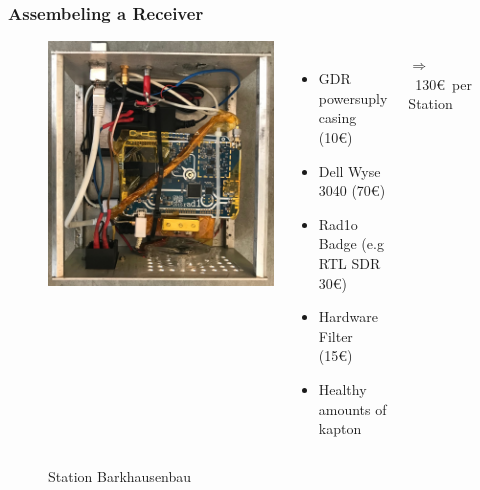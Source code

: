 \begin{frame}
\frametitle{Assembeling a Receiver}

\begin{figure}
\begin{columns}
\begin{center}
\includegraphics[height=0.7\textheight]{figs/station_barkhausen.jpg}
\end{center}
\raggedright
\caption{Station Barkhausenbau}
\vspace{0.5cm}

\begin{itemize}
  \item GDR powersuply casing (10\euro)
  \item Dell Wyse 3040 (70\euro)
  \item Rad1o Badge (e.g RTL SDR 30\euro)
  \item Hardware Filter (15\euro)
  \item Healthy amounts of kapton
\end{itemize}

$\Rightarrow$ ~130\euro \ per Station

\end{columns}
\end{figure}

\end{frame}

